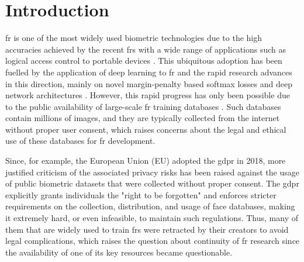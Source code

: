 \documentclass[10pt,twocolumn,letterpaper]{article}
\begin{document}
\section{Introduction}
\vspace{-2mm}
\acrfull{fr} is one of the most widely used biometric technologies due to the high accuracies achieved by the recent \acrshort{fr}s \cite{AdaFace2022,CosFace,ElasticFace} with a wide range of applications such as logical access control to portable devices \cite{prakash2021biometric,DBLP:journals/access/BoutrosSKDKK22}. 
This ubiquitous adoption has been fuelled by the application of deep learning to \acrshort{fr} and the rapid research advances in this direction, mainly on novel margin-penalty based softmax losses \cite{ArcFace, ElasticFace} and deep network architectures \cite{ResNet,DBLP:journals/access/BoutrosSKDKK22}. However, this rapid progress has only been possible due to the public availability of large-scale \acrshort{fr} training databases \cite{VGGFace2, MSCeleb1MDataset}.
Such databases contain millions of images, and they are typically collected from the internet without proper user consent, which raises concerns about the legal and ethical use of these databases for \acrshort{fr} development.


Since, for example, the European Union (EU) adopted the \acrfull{gdpr} \cite{european_commission_regulation_2016} in 2018, more justified criticism of the associated privacy risks has been raised against the usage of public biometric datasets that were collected without proper consent. The \acrshort{gdpr} explicitly grants individuals the "right to be forgotten" and enforces stricter requirements on the collection, distribution, and usage of face databases, making it extremely hard, or even infeasible, to maintain such regulations. Thus, many of them \cite{VGGFace2, UMDFacesDataset, MSCeleb1MDataset} that are widely used to train \acrshort{fr}s were retracted by their creators to avoid legal complications, which raises the question about continuity of \acrshort{fr} research since the availability of one of its key resources became questionable.  
\end{document}
